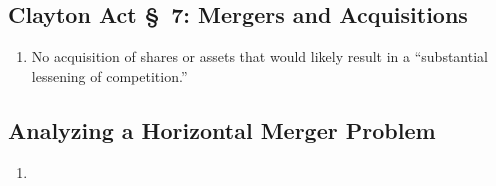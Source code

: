\subsection{Clayton Act \S\ 7: Mergers and Acquisitions}

\begin{enumerate}
    \item No acquisition of shares or assets that would likely result in a 
    ``substantial lessening of competition.''
\end{enumerate}

\subsection{Analyzing a Horizontal Merger Problem}

\begin{enumerate}
    \item %
\end{enumerate}
